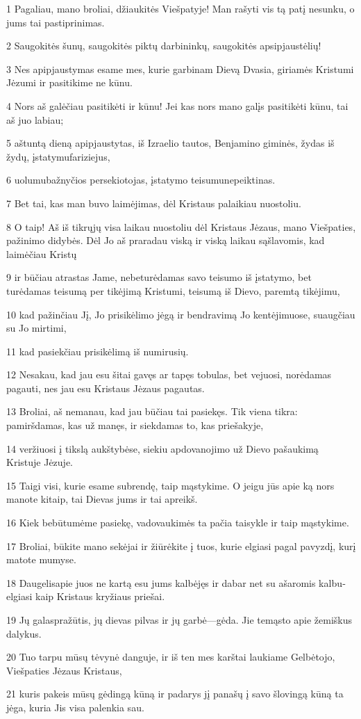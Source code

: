 \par 1 Pagaliau, mano broliai, džiaukitės Viešpatyje! Man rašyti vis tą patį nesunku, o jums tai pastiprinimas. 
\par 2 Saugokitės šunų, saugokitės piktų darbininkų, saugokitės apsipjaustėlių! 
\par 3 Nes apipjaustymas esame mes, kurie garbinam Dievą Dvasia, giriamės Kristumi Jėzumi ir pasitikime ne kūnu. 
\par 4 Nors aš galėčiau pasitikėti ir kūnu! Jei kas nors mano galįs pasitikėti kūnu, tai aš juo labiau; 
\par 5 aštuntą dieną apipjaustytas, iš Izraelio tautos, Benjamino giminės, žydas iš žydų, įstatymu­fariziejus, 
\par 6 uolumu­bažnyčios persekiotojas, įstatymo teisumu­nepeiktinas. 
\par 7 Bet tai, kas man buvo laimėjimas, dėl Kristaus palaikiau nuostoliu. 
\par 8 O taip! Aš iš tikrųjų visa laikau nuostoliu dėl Kristaus Jėzaus, mano Viešpaties, pažinimo didybės. Dėl Jo aš praradau viską ir viską laikau sąšlavomis, kad laimėčiau Kristų 
\par 9 ir būčiau atrastas Jame, nebeturėdamas savo teisumo iš įstatymo, bet turėdamas teisumą per tikėjimą Kristumi, teisumą iš Dievo, paremtą tikėjimu, 
\par 10 kad pažinčiau Jį, Jo prisikėlimo jėgą ir bendravimą Jo kentėjimuose, suaugčiau su Jo mirtimi, 
\par 11 kad pasiekčiau prisikėlimą iš numirusių. 
\par 12 Nesakau, kad jau esu šitai gavęs ar tapęs tobulas, bet vejuosi, norėdamas pagauti, nes jau esu Kristaus Jėzaus pagautas. 
\par 13 Broliai, aš nemanau, kad jau būčiau tai pasiekęs. Tik viena tikra: pamiršdamas, kas už manęs, ir siekdamas to, kas priešakyje, 
\par 14 veržiuosi į tikslą aukštybėse, siekiu apdovanojimo už Dievo pašaukimą Kristuje Jėzuje. 
\par 15 Taigi visi, kurie esame subrendę, taip mąstykime. O jeigu jūs apie ką nors manote kitaip, tai Dievas jums ir tai apreikš. 
\par 16 Kiek bebūtumėme pasiekę, vadovaukimės ta pačia taisykle ir taip mąstykime. 
\par 17 Broliai, būkite mano sekėjai ir žiūrėkite į tuos, kurie elgiasi pagal pavyzdį, kurį matote mumyse. 
\par 18 Daugelis­apie juos ne kartą esu jums kalbėjęs ir dabar net su ašaromis kalbu­elgiasi kaip Kristaus kryžiaus priešai. 
\par 19 Jų galas­pražūtis, jų dievas­ pilvas ir jų garbė—gėda. Jie temąsto apie žemiškus dalykus. 
\par 20 Tuo tarpu mūsų tėvynė danguje, ir iš ten mes karštai laukiame Gelbėtojo, Viešpaties Jėzaus Kristaus, 
\par 21 kuris pakeis mūsų gėdingą kūną ir padarys jį panašų į savo šlovingą kūną ta jėga, kuria Jis visa palenkia sau.


